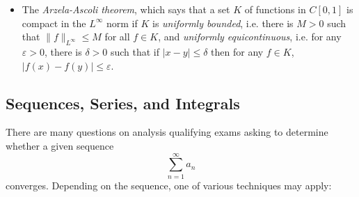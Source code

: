 \documentclass[answers]{exam}
\theoremstyle{problemstyle}
\newcommand{\1}[1]{\textbf{1}_{\left[#1\right]}} %
\begin{document}
\begin{itemize}
	\item The \emph{Arzela-Ascoli theorem}, which says that a set $K$ of functions in $C[0,1]$ is compact in the $L^\infty$ norm if $K$ is \emph{uniformly bounded}, i.e. there is $M > 0$ such that $\| f \|_{L^\infty} \leq M$ for all $f \in K$, and \emph{uniformly equicontinuous}, i.e. for any $\varepsilon > 0$, there is $\delta > 0$ such that if $|x - y| \leq \delta$ then for any $f \in K$, $|f(x) - f(y)| \leq \varepsilon$.
\end{itemize}

\subsection*{Sequences, Series, and Integrals}

There are many questions on analysis qualifying exams asking to determine whether a given sequence
%
\[ \sum_{n = 1}^\infty a_n \]
%
converges. Depending on the sequence, one of various techniques may apply:
%
\end{document}
